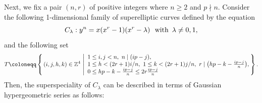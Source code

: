 \documentclass{article}
\theoremstyle{definition}
\begin{document}
Next, we fix a pair $(n,r)$ of positive integers where $n \geq 2$ and $p \nmid n$. 
Consider the following 1-dimensional family of superelliptic curves defined by the equation\vspace{-1mm}
\begin{equation}\label{eq:Clambda}
    C_\lambda: y^n = x(x^r-1)(x^r-\lambda) \ \text{ with }\, \lambda \neq 0,1,\vspace{-0.5mm}
\end{equation}
and the following set\vspace{-0.8mm}
\begin{equation}\label{eq:T}
    T \coloneqq \left\{
    \,(i,j,h,k) \in \mathbb{Z}^4\ \middle|
    \begin{array}{l}
        1 \leq i,j < n,\ n \mid (ip-j),\\[-0.2mm]
        1 \leq h < (2r+1)i/n,\ 1 \leq k < (2r+1)j/n,\ r \mid \bigl(hp-k - \frac{ip-j}{n}\bigr),\\
        0 \leq hp-k-\frac{ip-j}{n} \leq 2r\frac{ip-j}{n}
    \end{array}\hspace{-1mm}\right\}.\vspace{-0.4mm}
\end{equation}
Then, the superspeciality of $C_\lambda$ can be described in terms of Gaussian hypergeometric series as follows:\vspace{-1.3mm}
\end{document}
